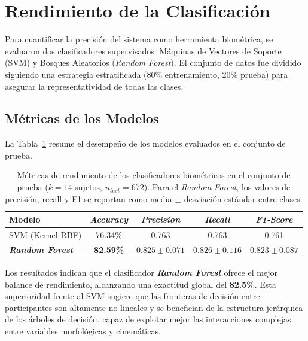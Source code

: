 \section{Rendimiento de la Clasificación}

Para cuantificar la precisión del sistema como herramienta biométrica, se evaluaron dos clasificadores supervisados: Máquinas de Vectores de Soporte (SVM) y Bosques Aleatorios (\textit{Random Forest}).
El conjunto de datos fue dividido siguiendo una estrategia estratificada (80\% entrenamiento, 20\% prueba) para asegurar la representatividad de todas las clases.
\subsection{Métricas de los Modelos}

La Tabla~\ref{tab:resultados_clasificacion} resume el desempeño de los modelos evaluados en el conjunto de prueba.
\begin{table}[H]
	\centering
	\caption[Rendimiento de los clasificadores biométricos en el conjunto de prueba.]{Métricas de rendimiento de los clasificadores biométricos 
		en el conjunto de prueba ($k=14$ sujetos, $n_{test}=672$).
		Para el 
		\textit{Random Forest}, los valores de precisión, recall y F1 se 
		reportan como media $\pm$ desviación estándar entre clases.}
	\vspace{0.2cm}
	\begin{tabular}{lcccc}
		\toprule
		\textbf{Modelo} & \textbf{\textit{Accuracy}} & \textbf{\textit{Precision}} 
		& \textbf{\textit{Recall}} & \textbf{\textit{F1-Score}} \\
		\midrule
		SVM (Kernel RBF) & 76.34\% & 0.763 & 0.763 & 0.761 \\
		\textbf{\textit{Random Forest}} & \textbf{82.59\%} 
		& $\mathbf{0.825 \pm 0.071}$ 
		& $\mathbf{0.826 \pm 0.116}$ 
		& $\mathbf{0.823 \pm 0.087}$ \\
		\bottomrule
	\end{tabular}
	\label{tab:resultados_clasificacion}
\end{table}

Los resultados indican que el clasificador \textbf{\textit{Random Forest}} ofrece el mejor balance de rendimiento, alcanzando una exactitud global del \textbf{82.5\%}.
Esta superioridad frente al SVM sugiere que las fronteras de decisión entre participantes son altamente no lineales y se benefician de la estructura jerárquica de los árboles de decisión, capaz de explotar mejor las interacciones complejas entre variables morfológicas y cinemáticas.
